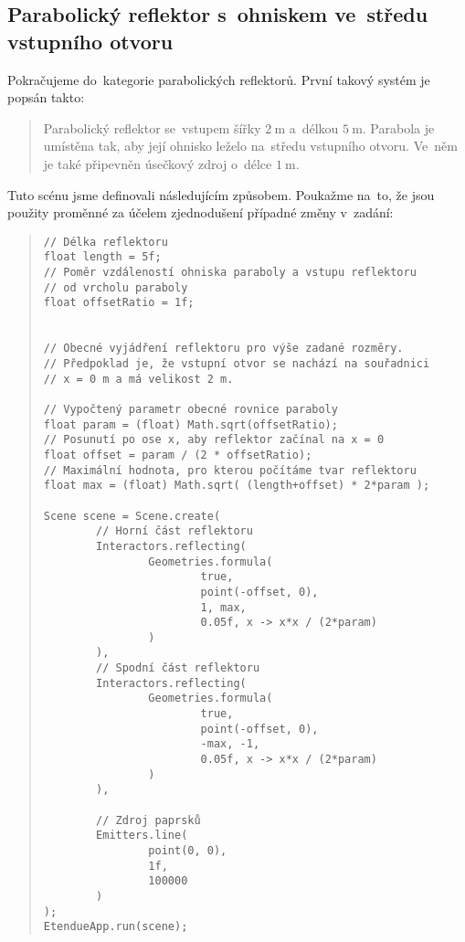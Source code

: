 \subsection{Parabolický reflektor s~ohniskem ve~středu vstupního otvoru}

Pokračujeme do~kategorie parabolických reflektorů. První takový systém je popsán takto:

\begin{quote}
    Parabolický reflektor se~vstupem šířky $2\ \mathrm{m}$ a~délkou $5\ \mathrm{m}$. Parabola je umístěna tak, aby její ohnisko leželo na~středu vstupního otvoru. Ve~něm je také připevněn úsečkový zdroj o~délce $1\ \mathrm{m}$.
\end{quote}

\beautypage

Tuto scénu jsme definovali následujícím způsobem. Poukažme na~to, že jsou použity proměnné za účelem zjednodušení případné změny v~zadání:

\begin{minipage}{\textwidth}\begin{quote}\begin{lstlisting}
// Délka reflektoru
float length = 5f;
// Poměr vzdáleností ohniska paraboly a vstupu reflektoru
// od vrcholu paraboly
float offsetRatio = 1f;


// Obecné vyjádření reflektoru pro výše zadané rozměry.
// Předpoklad je, že vstupní otvor se nachází na souřadnici
// x = 0 m a má velikost 2 m.

// Vypočtený parametr obecné rovnice paraboly
float param = (float) Math.sqrt(offsetRatio);
// Posunutí po ose x, aby reflektor začínal na x = 0
float offset = param / (2 * offsetRatio);
// Maximální hodnota, pro kterou počítáme tvar reflektoru
float max = (float) Math.sqrt( (length+offset) * 2*param );

Scene scene = Scene.create(
        // Horní část reflektoru
        Interactors.reflecting(
                Geometries.formula(
                        true,
                        point(-offset, 0),
                        1, max,
                        0.05f, x -> x*x / (2*param)
                )
        ),
        // Spodní část reflektoru
        Interactors.reflecting(
                Geometries.formula(
                        true,
                        point(-offset, 0),
                        -max, -1,
                        0.05f, x -> x*x / (2*param)
                )
        ),

        // Zdroj paprsků
        Emitters.line(
                point(0, 0),
                1f,
                100000
        )
);
EtendueApp.run(scene);
\end{lstlisting}\end{quote}\end{minipage}

